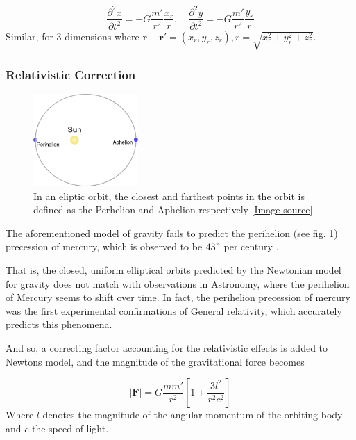 \documentclass[10pt,showpacs,preprintnumbers,footinbib,amsmath,amssymb,aps,prl,twocolumn,groupedaddress,superscriptaddress,showkeys]{revtex4-1}
\begin{document}
    \begin{equation}
      \frac{\partial^2 x}{\partial t^2} = -G\frac{m'}{r^2}\frac{x_r}{r}, \quad
      \frac{\partial^2 y}{\partial t^2} = -G\frac{m'}{r^2}\frac{y_r}{r}
    \end{equation}
    Similar, for 3 dimensions where $\mathbf r - \mathbf r' = (x_r, y_r, z_r), r=\sqrt{x_r^2 + y_r^2 + z_r^2}$.

    \subsubsection{Relativistic Correction}

      \begin{figure}[h!]
        \center
        \includegraphics[width=4cm]{figs/486px-Perihelion-Aphelion.png}
        \caption{In an eliptic orbit, the closest and farthest points in the orbit is defined as the Perhelion and Aphelion respectively [\href{https://en.wikipedia.org/wiki/Perihelion_and_aphelion}{Image source}]}
        \label{fig:perhelion}
      \end{figure}

      The aforementioned model of gravity fails to predict the perihelion (see fig. \ref{fig:perhelion}) precession of mercury, which is observed to be $43"$ per century \cite{problem_set}. 

      That is, the closed, uniform elliptical orbits predicted by the Newtonian model for gravity does not match with observations in Astronomy, where the perihelion of Mercury seems to shift over time. In fact, the perihelion precession of mercury was the first experimental confirmations of General relativity, which accurately predicts this phenomena.

      And so, a correcting factor accounting for the relativistic effects is added to Newtons model, and the magnitude of the gravitational force becomes \cite{problem_set}

      \begin{equation}
        |\mathbf F| = G \frac{m m'}{r^2}\left[1 + \frac{3l^2}{r^2c^2}\right]
      \end{equation}
      Where $l$ denotes the magnitude of the angular momentum of the orbiting body and $c$ the speed of light.
\end{document}
